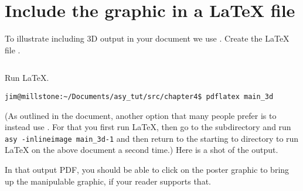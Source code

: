 \section{Include the graphic in a \LaTeX{} file}
To illustrate including 3D output in your document we use
.
Create the \LaTeX{} file . 
\begin{center}
  \inputminted{TeX}{chapter4/main_3d.tex}
\end{center} 
Run \LaTeX{}. 
\begin{verbatim}
jim@millstone:~/Documents/asy_tut/src/chapter4$ pdflatex main_3d
\end{verbatim}
(As outlined in the document,
another option that many people prefer
is to instead use \texttt{}.
For that you first run \LaTeX{}, then go to the  subdirectory and
run \texttt{asy -inlineimage main_3d-1} and then return
to the starting to directory to run \LaTeX{} on the above document a
second time.)
Here is a shot of the output.
\begin{center}
\end{center}
In that output PDF, 
you should be able to click on the poster graphic to bring up
the manipulable graphic,
if your reader supports that. 



